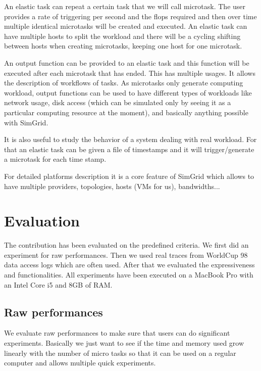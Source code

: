 \documentclass[a4paper, onecolumn]{article}
\begin{document}
  An elastic task can repeat a certain task that we will call microtask. The 
  user provides a rate of triggering per second and the flops required and then 
  over time multiple identical microtasks will be created and executed. An 
  elastic task can have multiple hosts to split the workload and there will be 
  a cycling shifting between hosts when creating microtasks, keeping one host 
  for one microtask.
  
  An output function can be provided to an elastic task and this function will 
  be executed after each microtask that has ended. This has multiple usages. It 
  allows the description of workflows of tasks. As microtasks only generate 
  computing workload, output functions can be used to have different types of 
  workloads like network usage, disk access (which can be simulated only by 
  seeing it as a particular computing resource at the moment), and basically 
  anything possible with SimGrid.
  
  It is also useful to study the behavior of a system dealing with real 
  workload. For that an elastic task can be given a file of timestamps and it 
  will trigger/generate a microtask for each time stamp.
  
  For detailed platforms description it is a core feature of SimGrid which 
  allows to have multiple providers, topologies, hosts (VMs for us), 
  bandwidths... %


\section{Evaluation} \label{eval}
  The contribution has been evaluated on the predefined criteria. We first did 
  an experiment for raw performances. Then we used real traces from WorldCup 98 
  data access logs \cite{wc98} which are often used. After that we evaluated 
  the expressiveness and functionalities. All experiments have been executed on 
  a MacBook Pro with an Intel Core i5 and 8GB of RAM.
  
    
  \subsection{Raw performances} \label{raw_perf}
    We evaluate raw performances to make sure that users can do significant 
    experiments. Basically we just want to see if the time and memory used grow 
    linearly with the number of micro tasks so that it can be used on a regular 
    computer and allows multiple quick experiments.
  
\end{document}
